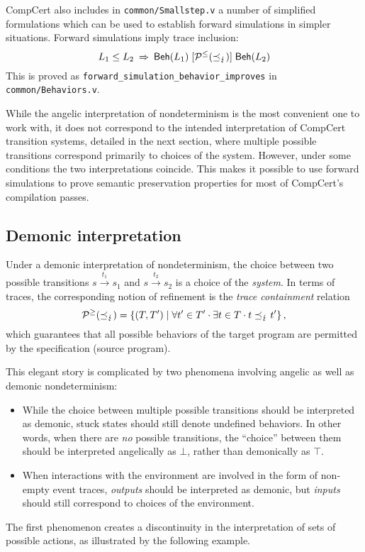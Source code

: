 \documentclass[sigplan,10pt,authordraft]{acmart}
\newcommand{\bdot}{\cdot}
\begin{document}
CompCert also includes in \texttt{common/Smallstep.v}
a number of simplified formulations
which can be used to establish forward simulations
in simpler situations.
Forward simulations imply trace inclusion:
\[
  L_1 \le L_2
  \: \Rightarrow \:
   \mathsf{Beh} (L_1) \mathrel{[{\mathcal{P}^\le(\preceq_\lightning)}]}  \mathsf{Beh} (L_2)
\]
This is proved as \texttt{forward\_simulation\_behavior\_improves}
in \texttt{common/Behaviors.v}.

While the angelic interpretation
of nondeterminism is the most convenient one to work with,
it does not correspond to the intended interpretation
of CompCert transition systems,
detailed in the next section,
where multiple possible transitions correspond
primarily to choices of the system.
However,
under some conditions
the two interpretations coincide.
This makes it possible to use forward simulations
to prove semantic preservation properties
for most of CompCert's compilation passes.


\subsection{Demonic interpretation} %

Under a demonic interpretation of nondeterminism,
the choice between two possible transitions
$s \stackrel{t_1}{\longrightarrow} s_1$ and
$s \stackrel{t_2}{\longrightarrow} s_2$
is a choice of the \emph{system}.
In terms of traces,
the corresponding notion of refinement
is the \emph{trace containment} relation
\[
  \mathcal{P}^\ge({\refby_\lightning}) =
  \{ (T, T') \mid \forall t' \in T' \bdot \exists t \in T \bdot
    t \refby_\lightning t' \}
  \,,
\]
which guarantees that all possible behaviors of the target program
are permitted by the specification (source program).

This elegant story is complicated by two phenomena
involving angelic as well as demonic nondeterminism:
\begin{itemize}
  \item
    While the choice between multiple possible transitions
    should be interpreted as demonic,
    stuck states should still denote undefined behaviors.
    In other words,
    when there are \emph{no} possible transitions,
    the ``choice'' between them should be interpreted
    angelically as $\bot$,
    rather than demonically as $\top$.
  \item
    When interactions with the environment are involved
    in the form of non-empty event traces,
    \emph{outputs} should be interpreted as demonic,
    but \emph{inputs} should still correspond to
    choices of the environment.
\end{itemize}
The first phenomenon creates a discontinuity
in the interpretation of sets of possible actions,
as illustrated by the following example.
\end{document}
